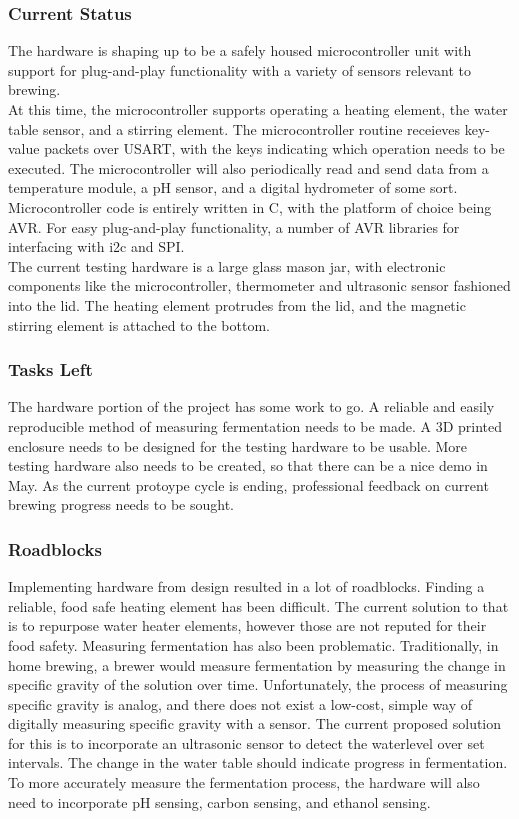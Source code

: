 \documentclass[draftclsnofoot,onecolumn,letterpaper,10pt]{IEEEtran}
\begin{document}
\subsubsection{Current Status}
The hardware is shaping up to be a safely housed microcontroller unit with support
for plug-and-play functionality with a variety of sensors relevant to brewing. \\
At this time, the microcontroller supports operating a heating element, the water
table sensor, and a stirring element.
The microcontroller routine receieves key-value packets over USART, with the keys
indicating which operation needs to be executed.
The microcontroller will also periodically read and send data from a temperature
module, a pH sensor, and a digital hydrometer of some sort.
Microcontroller code is entirely written in C, with the platform of choice being
AVR.
For easy plug-and-play functionality, a number of AVR libraries for interfacing
with i2c and SPI. \\
The current testing hardware is a large glass mason jar, with electronic components
like the microcontroller, thermometer and ultrasonic sensor fashioned into the lid.
The heating element protrudes from the lid, and the magnetic stirring element
is attached to the bottom.

\subsubsection{Tasks Left}
The hardware portion of the project has some work to go.
A reliable and easily reproducible method of measuring fermentation needs to be made.
A 3D printed enclosure needs to be designed for the testing hardware to be usable.
More testing hardware also needs to be created, so that there can be a nice demo in May.
As the current protoype cycle is ending, professional feedback on current brewing progress
needs to be sought.

\subsubsection{Roadblocks}
Implementing hardware from design resulted in a lot of roadblocks.
Finding a reliable, food safe heating element has been difficult.
The current solution to that is to repurpose water heater elements, however those
are not reputed for their food safety.
Measuring fermentation has also been problematic.
Traditionally, in home brewing, a brewer would measure fermentation by measuring
the change in specific gravity of the solution over time.
Unfortunately, the process of measuring specific gravity is analog, and there does
not exist a low-cost, simple way of digitally measuring specific gravity with a
sensor.
The current proposed solution for this is to incorporate an ultrasonic sensor to
detect the waterlevel over set intervals.
The change in the water table should indicate progress in fermentation.
To more accurately measure the fermentation process, the hardware will also need
to incorporate pH sensing, carbon sensing, and ethanol sensing.
\end{document}
